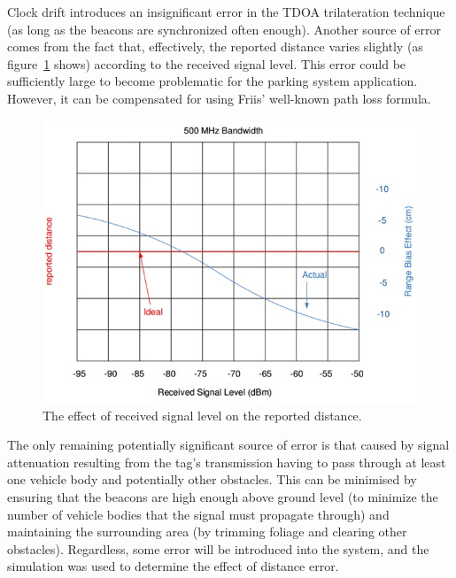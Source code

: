 \newpage
{}
Clock drift introduces an insignificant error in the TDOA trilateration technique (as long as the beacons are synchronized often enough). Another source of error comes from the fact that, effectively, the reported distance varies slightly (as figure~\ref{fig:reported-distance} shows) according to the received signal level. This error could be sufficiently large to become problematic for the parking system application. However, it can be compensated for using Friis' well-known path loss formula.\cite{2}



\begin{figure}[H]
\begin{center}
\includegraphics[scale=0.8]{data/software/4.jpg}
\caption{The effect of received signal level on the reported distance.\cite{2}}
\label{fig:reported-distance}
\end{center}
\end{figure}

The only remaining potentially significant source of error is that caused by signal attenuation resulting from the tag's transmission having to pass through at least one vehicle body and potentially other obstacles. This can be minimised by ensuring that the beacons are high enough above ground level (to minimize the number of vehicle bodies that the signal must propagate through) and maintaining the surrounding area (by trimming foliage and clearing other obstacles). Regardless, some error will be introduced into the system, and the simulation was used to determine the effect of distance error.

